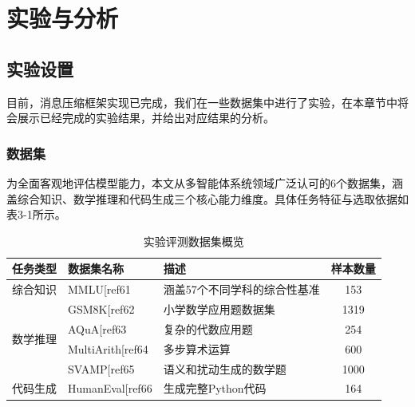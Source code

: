 \documentclass[11pt, a4paper]{article}
\makeatletter
\let\oldcite\cite
\renewcommand{\cite}{\@ifnextchar[{\cite@with}{\cite@without}}
\newcommand{\cite@with}[2][]{\textsuperscript{\oldcite[#1]{#2}}}
\newcommand{\cite@without}[1]{\textsuperscript{\oldcite{#1}}}
\numberwithin{figure}{section}
\makeatother
\begin{document}
\newpage

\section{实验与分析}
\subsection{实验设置}
目前，消息压缩框架实现已完成，我们在一些数据集中进行了实验，在本章节中将会展示已经完成的实验结果，并给出对应结果的分析。

\subsubsection{数据集}
为全面客观地评估模型能力，本文从多智能体系统领域广泛认可的6个数据集，涵盖综合知识、数学推理和代码生成三个核心能力维度。具体任务特征与选取依据如表3-1所示。


\vspace{26pt}
\begin{table}[H]
    \centering
    {
        \fontsize{12pt}{26pt}\selectfont
        \begin{tabular}{|c|p{3.5cm}|p{6.5cm}|c|}
            \hline
            任务类型 & 数据集名称 & 描述 & 样本数量\\
            \hline
            综合知识 & MMLU\cite{ref61} & 涵盖57个不同学科的综合性基准 & 153 \\
            \hline
            \multirow{4}{*}{数学推理} & GSM8K\cite{ref62} & 小学数学应用题数据集 & 1319 \\
            \cline{2-4} %
             & AQuA\cite{ref63}& 复杂的代数应用题 & 254 \\
            \cline{2-4}
             & MultiArith\cite{ref64} & 多步算术运算 & 600 \\
            \cline{2-4}
             & SVAMP\cite{ref65} & 语义和扰动生成的数学题 & 1000 \\
            \hline
            代码生成 & HumanEval\cite{ref66} & 生成完整Python代码 & 164 \\
            \hline
        \end{tabular}
    }
    \caption{实验评测数据集概览}
    \label{tab:dataset_overview}
\end{table}
\end{document}
